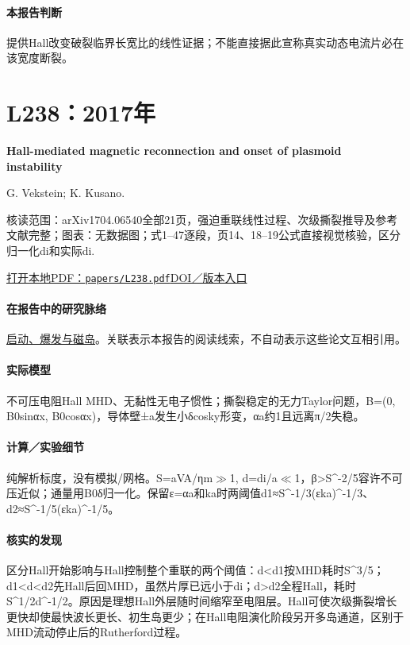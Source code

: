 \paragraph{本报告判断}提供Hall改变破裂临界长宽比的线性证据；不能直接据此宣称真实动态电流片必在该宽度断裂。

\section{L238：2017年}\label{paper:L238}

\textbf{Hall-mediated magnetic reconnection and onset of plasmoid instability}\citep{L238}\

G. Vekstein;  K. Kusano.

\textsf{核读范围：}arXiv1704.06540全部21页，强迫重联线性过程、次级撕裂推导及参考文献完整；\textsf{图表：}无数据图；式1–47逐段，页14、18–19公式直接视觉核验，区分归一化di和实际di.

\href{run:papers/L238.pdf}{打开本地PDF：\texttt{papers/L238.pdf}}\quad\href{https://arxiv.org/abs/1704.06540}{DOI／版本入口}

\paragraph{在报告中的研究脉络}\hyperref[story:onset]{启动、爆发与磁岛}。关联表示本报告的阅读线索，不自动表示这些论文互相引用。

\paragraph{实际模型}不可压电阻Hall MHD、无黏性无电子惯性；撕裂稳定的无力Taylor问题，B=(0, B0sinαx, B0cosαx)，导体壁±a发生小δcosky形变，αa约1且远离π/2失稳。

\paragraph{计算／实验细节}纯解析标度，没有模拟/网格。S=aVA/ηm\ensuremath{\gg}1, d=di/a\ensuremath{\ll}1，β>S\textasciicircum{}-2/5容许不可压近似；通量用B0δ归一化。保留ε=αa和ka时两阈值d1≈S\textasciicircum{}-1/3(εka)\textasciicircum{}-1/3、d2≈S\textasciicircum{}-1/5(εka)\textasciicircum{}-1/5。

\paragraph{核实的发现}区分Hall开始影响与Hall控制整个重联的两个阈值：d<d1按MHD耗时S\textasciicircum{}3/5；d1<d<d2先Hall后回MHD，虽然片厚已远小于di；d>d2全程Hall，耗时S\textasciicircum{}1/2d\textasciicircum{}-1/2。原因是理想Hall外层随时间缩窄至电阻层。Hall可使次级撕裂增长更快却使最快波长更长、初生岛更少；在Hall电阻演化阶段另开多岛通道，区别于MHD流动停止后的Rutherford过程。

